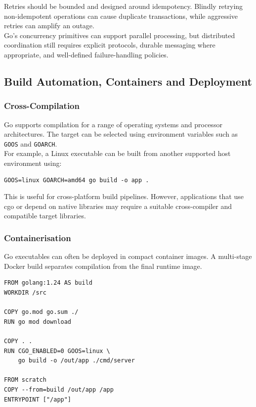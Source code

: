 Retries should be bounded and designed around idempotency. Blindly retrying non-idempotent operations can cause duplicate transactions, while aggressive retries can amplify an outage.\\

Go's concurrency primitives can support parallel processing, but distributed coordination still requires explicit protocols, durable messaging where appropriate, and well-defined failure-handling policies.

\subsection{Build Automation, Containers and Deployment}

\subsubsection{Cross-Compilation}

Go supports compilation for a range of operating systems and processor architectures. The target can be selected using environment variables such as \texttt{GOOS} and \texttt{GOARCH}.\\

For example, a Linux executable can be built from another supported host environment using:

\begin{lstlisting}
GOOS=linux GOARCH=amd64 go build -o app .
\end{lstlisting}

This is useful for cross-platform build pipelines. However, applications that use cgo or depend on native libraries may require a suitable cross-compiler and compatible target libraries.

\subsubsection{Containerisation}

Go executables can often be deployed in compact container images. A multi-stage Docker build separates compilation from the final runtime image.

\begin{lstlisting}
FROM golang:1.24 AS build
WORKDIR /src

COPY go.mod go.sum ./
RUN go mod download

COPY . .
RUN CGO_ENABLED=0 GOOS=linux \
    go build -o /out/app ./cmd/server

FROM scratch
COPY --from=build /out/app /app
ENTRYPOINT ["/app"]
\end{lstlisting}

